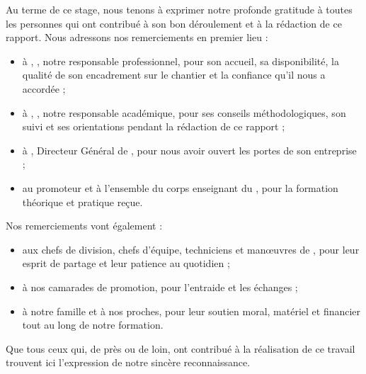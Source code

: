 
Au terme de ce stage, nous tenons à exprimer notre profonde gratitude à toutes les personnes
qui ont contribué à son bon déroulement et à la rédaction de ce rapport. Nous adressons nos
remerciements en premier lieu :

\begin{itemize}
  \item à \InfoTuteurPro, \InfoTuteurProPoste, notre responsable professionnel, pour son accueil,
        sa disponibilité, la qualité de son encadrement sur le chantier et la confiance qu'il nous
        a accordée ;
  \item à \InfoTuteurAcad, \InfoTuteurAcadPoste, notre responsable académique, pour ses conseils
        méthodologiques, son suivi et ses orientations pendant la rédaction de ce rapport ;
  \item à \InfoEntrepriseDirigeant, Directeur Général de \InfoEntreprise, pour nous avoir ouvert
        les portes de son entreprise ;
  \item au promoteur et à l'ensemble du corps enseignant du \InfoCFP, pour la formation théorique
        et pratique reçue.
\end{itemize}

Nos remerciements vont également :

\begin{itemize}
  \item aux chefs de division, chefs d'équipe, techniciens et manœuvres de \InfoEntrepriseSigle,
        pour leur esprit de partage et leur patience au quotidien ;
  \item à nos camarades de promotion, pour l'entraide et les échanges ;
  \item à notre famille et à nos proches, pour leur soutien moral, matériel et financier tout au
        long de notre formation.
\end{itemize}

Que tous ceux qui, de près ou de loin, ont contribué à la réalisation de ce travail trouvent
ici l'expression de notre sincère reconnaissance.

